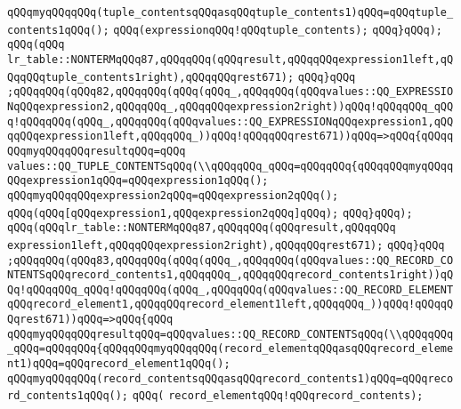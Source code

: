 \verb|qQQqmyqQQqqQQq(tuple_contentsqQQqasqQQqtuple_contents1)qQQq=qQQqtuple_contents1qQQq();|\newline
\verb|qQQq(expressionqQQq!qQQqtuple_contents);|\newline
\verb|qQQq}qQQq);|\newline
\verb|qQQq(qQQq|\newline
\verb|lr_table::NONTERMqQQq87,qQQqqQQq(qQQqresult,qQQqqQQqexpression1left,qQQqqQQqtuple_contents1right),qQQqqQQqrest671);|\newline
\verb|qQQq}qQQq|\newline
\verb|;qQQqqQQq(qQQq82,qQQqqQQq(qQQq(qQQq_,qQQqqQQq(qQQqvalues::QQ_EXPRESSIONqQQqexpression2,qQQqqQQq_,qQQqqQQqexpression2right))qQQq!qQQqqQQq_qQQq!qQQqqQQq(qQQq_,qQQqqQQq(qQQqvalues::QQ_EXPRESSIONqQQqexpression1,qQQqqQQqexpression1left,qQQqqQQq_))qQQq!qQQqqQQqrest671))qQQq=>qQQq{qQQqqQQqmyqQQqqQQqresultqQQq=qQQq|\newline
\verb|values::QQ_TUPLE_CONTENTSqQQq(\\qQQqqQQq_qQQq=qQQqqQQq{qQQqqQQqmyqQQqqQQqexpression1qQQq=qQQqexpression1qQQq();|\newline
\verb|qQQqmyqQQqqQQqexpression2qQQq=qQQqexpression2qQQq();|\newline
\verb|qQQq(qQQq[qQQqexpression1,qQQqexpression2qQQq]qQQq);|\newline
\verb|qQQq}qQQq);|\newline
\verb|qQQq(qQQqlr_table::NONTERMqQQq87,qQQqqQQq(qQQqresult,qQQqqQQq|\newline
\verb|expression1left,qQQqqQQqexpression2right),qQQqqQQqrest671);|\newline
\verb|qQQq}qQQq|\newline
\verb|;qQQqqQQq(qQQq83,qQQqqQQq(qQQq(qQQq_,qQQqqQQq(qQQqvalues::QQ_RECORD_CONTENTSqQQqrecord_contents1,qQQqqQQq_,qQQqqQQqrecord_contents1right))qQQq!qQQqqQQq_qQQq!qQQqqQQq(qQQq_,qQQqqQQq(qQQqvalues::QQ_RECORD_ELEMENTqQQqrecord_element1,qQQqqQQqrecord_element1left,qQQqqQQq_))qQQq!qQQqqQQqrest671))qQQq=>qQQq{qQQq|\newline
\verb|qQQqmyqQQqqQQqresultqQQq=qQQqvalues::QQ_RECORD_CONTENTSqQQq(\\qQQqqQQq_qQQq=qQQqqQQq{qQQqqQQqmyqQQqqQQq(record_elementqQQqasqQQqrecord_element1)qQQq=qQQqrecord_element1qQQq();|\newline
\verb|qQQqmyqQQqqQQq(record_contentsqQQqasqQQqrecord_contents1)qQQq=qQQqrecord_contents1qQQq();|\newline
\verb|qQQq(|\newline
\verb|record_elementqQQq!qQQqrecord_contents);|\newline
